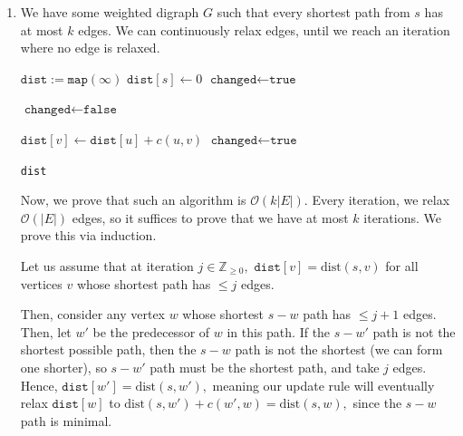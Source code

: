 \documentclass[12pt]{article}
\begin{document}
\begin{enumerate}
  \item We have some weighted digraph $G$ such that every shortest
    path from $s$ has at most $k$ edges. We can continuously relax
    edges, until we reach an iteration where no edge is relaxed.

    \begin{algorithm}
      \begin{algorithmic}
        \State $\texttt{dist} := \texttt{map}(\infty)$ 
        \State $\texttt{dist}[s] \gets 0$
        \State $\texttt{changed} \gets \texttt{true}$

        \vspace{3mm}

        \State $\texttt{changed} \gets \texttt{false}$

        \vspace{3mm}

        \State $\texttt{dist}[v] \gets \texttt{dist}[u] + c(u, v)$
        \State $\texttt{changed} \gets \texttt{true}$
        \EndIf
        \EndFor
        \EndWhile

        \vspace{3mm}

        \State \Return \texttt{dist}
        \EndProcedure
      \end{algorithmic}
    \end{algorithm}

    Now, we prove that such an algorithm is $\mathcal O(k |E|).$
    Every iteration, we relax $\mathcal O(|E|)$ edges, so it suffices
    to prove that we have at most $k$ iterations. We prove this via induction.

    Let us assume that at iteration $j \in \mathbb Z_{\geq 0},$
    $\texttt {dist}[v] = \text{dist}(s, v)$ for all vertices $v$
    whose shortest path has $\leq j$ edges.

    Then, consider any vertex $w$ whose shortest $s-w$ path has $\leq
    j + 1$ edges. Then, let $w'$ be the predecessor of $w$ in this
    path. If the $s-w'$ path is not the shortest possible path, then
    the $s-w$ path is not the shortest (we can form one shorter), so
    $s-w'$ path must be the shortest path, and take $j$ edges. Hence,
    $\texttt{dist}[w'] = \text{dist}(s, w'),$ meaning our update rule
    will eventually relax $\texttt{dist}[w]$ to $\text{dist}(s, w') +
    c(w', w) = \text{dist}(s, w),$ since the $s-w$ path is minimal.


\end{enumerate}
\end{document}
